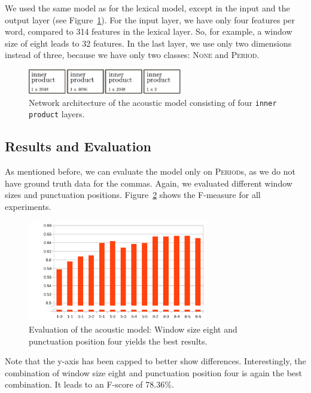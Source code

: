 We used the same model as for the lexical model, except in the input and the output layer (see Figure~\ref{fig:net_acoustic}).
For the input layer, we have only four features per word, compared to 314 features in the lexical layer.
So, for example, a window size of eight leads to 32 features.
In the last layer, we use only two dimensions instead of three, because we have only two classes: \textsc{None} and \textsc{Period}.

\begin{figure}[ht]
    \centering
    \includegraphics[width=0.6\textwidth]{img/net_acoustic.pdf}
    \caption{Network architecture of the acoustic model consisting of four \texttt{inner product} layers.}
    \label{fig:net_acoustic}
\end{figure}


\subsection{Results and Evaluation}

As mentioned before, we can evaluate the model only on \textsc{Period}s, as we do not have ground truth data for the commas.
Again, we evaluated different window sizes and punctuation positions.
Figure~\ref{audio_eval} shows the F-measure for all experiments.
\begin{figure}[ht]
    \centering
    \includegraphics[width=0.7\textwidth]{img/audio_parameter_eval.png}
    \caption{Evaluation of the acoustic model: Window size eight and punctuation position four yields the best results.}
    \label{audio_eval}
\end{figure}
Note that the y-axis has been capped to better show differences.
Interestingly, the combination of window size eight and punctuation position four is again the best combination.
It leads to an F-score of 78.36\%.



